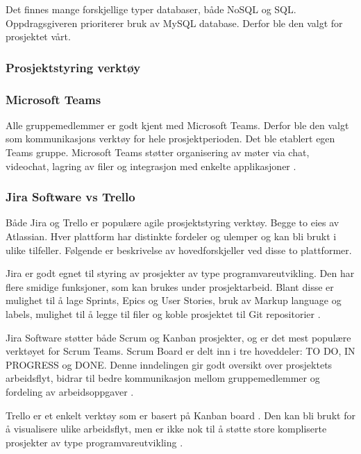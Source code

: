 Det finnes mange forskjellige typer databaser, både NoSQL og SQL. Oppdragsgiveren prioriterer bruk av MySQL database. Derfor ble den valgt for prosjektet vårt.

\subsubsection{Prosjektstyring verktøy}

\subsubsection*{Microsoft Teams}

Alle gruppemedlemmer er godt kjent med Microsoft Teams. Derfor ble den valgt som kommunikasjons verktøy for hele prosjektperioden. Det ble etablert egen Teams gruppe. Microsoft Teams støtter organisering av møter via chat, videochat, lagring av filer og integrasjon med enkelte applikasjoner \cite{4-microsoft-teams}.

\subsubsection*{Jira Software vs Trello}

Både Jira og Trello er populære agile prosjektstyring verktøy. Begge to eies av Atlassian. Hver plattform har distinkte fordeler og ulemper og kan bli brukt i ulike tilfeller. Følgende er beskrivelse av hovedforskjeller ved disse to plattformer.

Jira er godt egnet til styring av prosjekter av type programvareutvikling. Den har flere smidige funksjoner, som kan brukes under prosjektarbeid. Blant disse er mulighet til å lage Sprints, Epics og User Stories, bruk av Markup language og labels, mulighet til å legge til filer og koble prosjektet til Git repositorier \cite{4-atlassian.com-jira}.

Jira Software støtter både Scrum og Kanban prosjekter, og er det mest populære verktøyet for Scrum Teams. Scrum Board er delt inn i tre hoveddeler: TO DO, IN PROGRESS og DONE. Denne inndelingen gir godt oversikt over prosjektets arbeidsflyt, bidrar til bedre kommunikasjon mellom gruppemedlemmer og fordeling av arbeidsoppgaver \cite{4-atlassian.com-jira}.

Trello er et enkelt verktøy som er basert på Kanban board \cite{4-trello.com}. Den kan bli brukt for å visualisere ulike arbeidsflyt, men er ikke nok til å støtte store kompliserte prosjekter av type programvareutvikling \cite{4-technologyadvice.com}.

